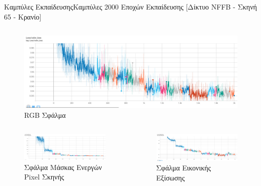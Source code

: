 \documentclass[10pt]{beamer}
\begin{document}
\begin{frame}{Καμπύλες Εκπαίδευσης}{Καμπύλες 2000 Εποχών Εκπαίδευσης [Δίκτυο NFFB - Σκηνή 65 - Κρανίο]}
\begin{columns}
        \begin{figure}
        \includegraphics[height=0.2\textheight]{images/chapter5_img/LossPlots/Tensorboard_Losses/NFFB/NFFB_RGBloss_PLot65.jpg}
        \caption{RGB Σφάλμα}
        \end{figure}
\end{columns}
\begin{columns}
        \begin{figure}
        \includegraphics[height=0.2\textheight]{images/chapter5_img/LossPlots/Tensorboard_Losses/NFFB/NFFB_Maskloss_PLot65.jpg}
        \caption{Σφάλμα Μάσκας Ενεργών Pixel Σκηνής}
        \end{figure}
        \begin{figure}
        \includegraphics[height=0.2\textheight]{images/chapter5_img/LossPlots/Tensorboard_Losses/NFFB/NFFB_Eikonalloss_PLot65.jpg}
        \caption{Σφάλμα Εικονικής Εξίσωσης}
        \end{figure}
\end{columns}
\end{frame}
\end{document}
